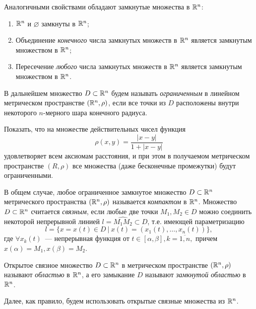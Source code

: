 \documentclass[../../main.tex]{subfiles}
\begin{document}
  Аналогичными свойствами обладают замкнутые множества в $\mathbb{R}^n$:
  \begin{enumerate}
    \item  $\mathbb{R}^n$  и $\varnothing$ замкнуты в $\mathbb{R}^n$;
    \item Объединение \emph{конечного}  числа замкнутых множеств в 
    $\mathbb{R}^n$ является замкнутым множеством в $\mathbb{R}^n$; 
    \item Пересечение \emph{любого} числа замкнутых множеств в $\mathbb{R}^n$ 
    является замкнутым множеством в $\mathbb{R}^n$.
  \end{enumerate} 
  
  
  В дальнейшем множество $D \subset \mathbb{R}^n$ будем называть 
  \emph{ограниченным} в линейном метрическом пространстве $ (\mathbb{R}^n, \rho) $, 
  если все точки из $D$ расположены внутри некоторого $n$-мерного шара 
  конечного радиуса.
  
  \begin{exc}
    Показать, что на множестве действительных чисел функция 
    \[ 
      \rho(x, y) = \frac{|x - y|}{1 + |x - y|}
    \] удовлетворяет всем аксиомам расстояния, и при этом в 
    получаемом метрическом пространстве $ (R, \rho) $ все множества 
    (даже бесконечные промежутки) будут ограниченными.   
   \end{exc} 
 
  \smallskip   
  В общем случае, любое ограниченное замкнутое множество $D \subset 
  \mathbb{R}^n$ метрического пространства $ (\mathbb{R}^n, \rho) $ называется 
  \emph{компактом} в $\mathbb{R}^n$.
  Множество $D \subset \mathbb{R}^n$ считается \emph{связным}, если любые две точки 
  $M_1,M_2 \in D $ можно соединить некоторой непрерывной линией $ l = 
  \widehat{M_1M_2} \subset D$, т.е. имеющей параметризацию
  \[
    l = \{x = x(t) \in D\ |\ x(t) = (x_1(t), \dots, x_n(t))\},
  \]
  где $\forall x_k(t)$~--- непрерывная функция от $t \in [\alpha, 
  \beta], k = \overline{1,n},$ причем $ x(\alpha) = M_1, x(\beta) = 
  M_2.$
   
  Открытое связное множество $D \subset \mathbb{R}^n$ в метрическом 
  пространстве $ (\mathbb{R}^n, \rho) $ называют \emph{областью} в $\mathbb{R}^n$, а 
  его замыкание $D$ называют \emph{замкнутой областью} в $\mathbb{R}^n$.
   
  Далее, как правило, будем использовать открытые связные множества 
  из $\mathbb{R}^n$.
  
\end{document}
